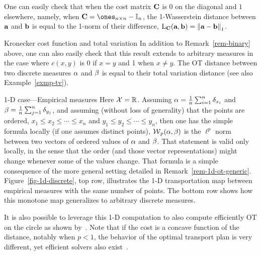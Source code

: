 \begin{rem}\label{rem-binary}
One can easily check that when the cost matrix $\mathrm{\textbf{C}}$ is 0 on the diagonal and $1$ elsewhere, namely, when $\C=\ones_{n\times n}-\Identity_n$, the 1-Wasserstein distance between $\mathrm{\textbf{a}}$ and $\mathrm{\textbf{b}}$ is equal to the 1-norm of their difference, $\mathrm{L}_{\mathrm{\textbf{C}}}(\mathrm{\textbf{a}},\mathrm{\textbf{b}})=\left\| \mathrm{\textbf{a}}-\mathrm{\textbf{b}} \right\|_1$.
\end{rem}

\begin{rem1}{Kronecker cost function and total variation}
In addition to Remark~\ref{rem-binary} above, one can also easily check that this result extends to arbitrary measures in the case where $c(x,y)$ is $0$ if $x=y$ and 1 when $x\ne y$. The OT distance between two discrete measures $\alpha$ and $\beta$ is equal to their total variation distance (see also Example~\ref{exmp-tv}).
\end{rem1}



\begin{rem1}{1-D case---Empirical measures}\label{rem-1d-empir}
Here $\mathcal{X}=\mathbb{R}$. Assuming $\alpha = \frac{1}{n}\sum_{i=1}^n \delta_{x_i}$ and $\beta = \frac{1}{n}\sum_{j=1}^n \delta_{y_j}$, and assuming (without loss of generality) that the points are ordered, \ie $x_1 \leq x_2 \leq \cdots \leq x_n$ and $y_1 \leq y_2 \leq \cdots \leq y_n$, then one has the simple formula
\ie locally (if one assumes distinct points), $\operatorname{\mathcal{W}}_p(\alpha,\beta)$ is the $\ell^p$ norm between two vectors of ordered values of $\alpha$ and $\beta$. That statement is valid only locally, in the sense that the order (and those vector representations) might change whenever some of the values change. That formula is a simple consequence of the more general setting detailed in Remark~\ref{rem-1d-ot-generic}.
%
Figure~\ref{fig-1d-discrete}, top row, illustrates the 1-D transportation map between empirical measures with the same number of points.  The bottom row shows how this monotone map generalizes to arbitrary discrete measures.


It is also possible to leverage this 1-D computation to also compute efficiently OT on the circle as shown by~\citet{delon-circle}.
%
Note that if the cost is a concave function of the distance, notably when $p<1$, the behavior of the optimal transport plan is very different, yet efficient solvers also exist~\citep{delon-concave}.
\end{rem1}


